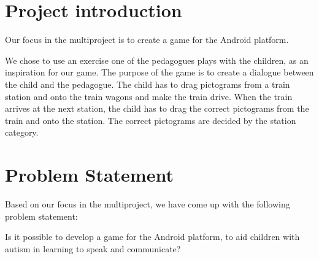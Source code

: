 \section*{Project introduction}

Our focus in the multiproject is to create a game for the Android platform. 

We chose to use an exercise one of the pedagogues plays with the children, as an inspiration for our game. The purpose of the game is to create a dialogue between the child and the pedagogue. The child has to drag pictograms from a train station and onto the train wagons and make the train drive. When the train arrives at the next station, the child has to drag the correct pictograms from the train and onto the station. The correct pictograms are decided by the station category.

\section*{Problem Statement}

Based on our focus in the multiproject, we have come up with the following problem statement:

Is it possible to develop a game for the Android platform, to aid children with autism in learning to speak and communicate?